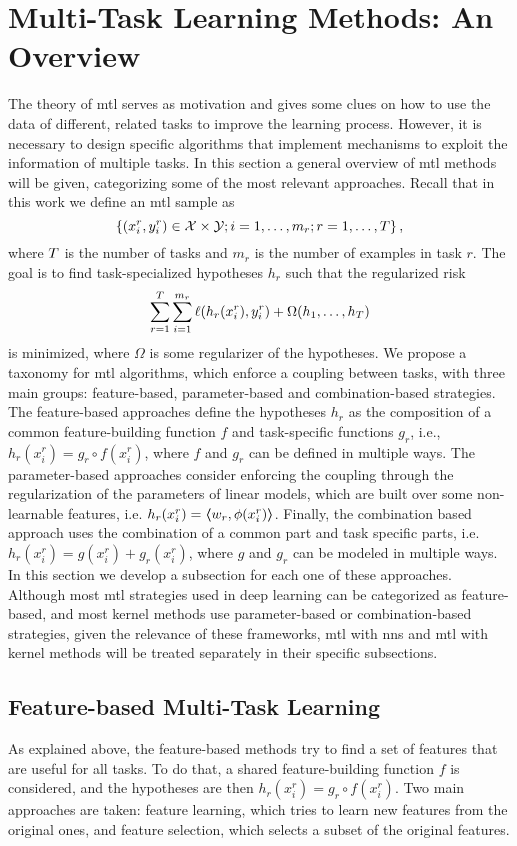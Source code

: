 \section{Multi-Task Learning Methods: An Overview}\label{sec:ch3_overview}
The theory of \acrshort{mtl} serves as motivation and gives some clues on how to use the data of different, related tasks to improve the learning process. However, it is necessary to design specific algorithms that implement mechanisms to exploit the information of multiple tasks.
In this section a general overview of \acrshort{mtl} methods will be given, categorizing some of the most relevant approaches. 
%
Recall that in this work we define an \acrshort{mtl} sample as
$$ \left\{(x_i^r, y_i^r) \in \mathcal{X} \times \mathcal{Y}; i=1,\ldots, m_r; r=1,\ldots, T\right\},$$
where $T$ is the number of tasks and $m_r$ is the number of examples in task $r$.
The goal is to find task-specialized hypotheses $h_r$ such that the regularized risk 
\begin{equation}
    \nonumber
    \sum_{r=1}^T \sum_{i=1}^{m_r} \ell(h_r(x_i^r), y_i^r) + \Omega(h_1, \ldots, h_T)
\end{equation}
is minimized, where $\Omega$ is some regularizer of the hypotheses. 
We propose a taxonomy for \acrshort{mtl} algorithms, which enforce a coupling between tasks, with three main groups: feature-based, parameter-based and combination-based strategies. 
The feature-based approaches define the hypotheses $h_r$ as the composition of a common feature-building function $f$ and task-specific functions $g_r$, i.e., $h_r(x_i^r) = g_r \circ f(x_i^r)$, where $f$ and $g_r$ can be defined in multiple ways.
The parameter-based approaches consider enforcing the coupling through the regularization of the parameters of linear models, which are built over some non-learnable features, i.e. $h_r(x_i^r) = \bm{\left\langle} w_r, \phi(x_i^r) \bm{\right\rangle}$.
Finally, the combination based approach uses the combination of a common part and task specific parts, i.e. $h_r(x_i^r) = g(x_i^r) + g_r(x_i^r)$, where $g$ and $g_r$ can be modeled in multiple ways.
In this section we develop a subsection for each one of these approaches.
%
Although most \acrshort{mtl} strategies used in deep learning can be categorized as feature-based, and most kernel methods use parameter-based or combination-based strategies, given the relevance of these frameworks, \acrshort{mtl} with \acrshort{nns} and \acrshort{mtl} with kernel methods will be treated separately in their specific subsections. 

\subsection{Feature-based Multi-Task Learning}\label{subsec:featbased_mtl}
As explained above, the feature-based methods try to find a set of features that are useful for all tasks.
To do that, a shared feature-building function $f$ is considered, and the hypotheses are then $h_r(x_i^r) = g_r \circ f(x_i^r)$.
Two main approaches are taken: feature learning, which tries to learn new features from the original ones, and feature selection, which selects a subset of the original features.



